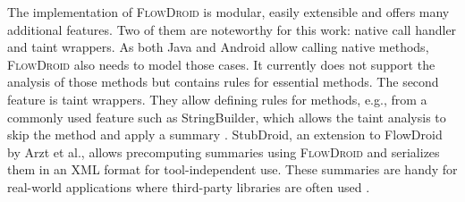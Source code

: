 \documentclass[../draft.tex]{subfiles}
\begin{document}
    The implementation of \textsc{FlowDroid} is modular, easily extensible and offers many additional features.
    Two of them are noteworthy for this work: native call handler and taint wrappers.
    As both Java and Android allow calling native methods, \textsc{FlowDroid} also needs to model those cases.
    It currently does not support the analysis of those methods but contains rules for essential methods.
    The second feature is taint wrappers.
    They allow defining rules for methods, e.g., from a commonly used feature such as StringBuilder, which allows the taint analysis to skip the method and apply a summary \cite{Arzt2014}.
    StubDroid, an extension to FlowDroid by Arzt et al., allows precomputing summaries using \textsc{FlowDroid} and serializes them in an XML format for tool-independent use.
    These summaries are handy for real-world applications where third-party libraries are often used \cite{Arzt2016}.
\end{document}
